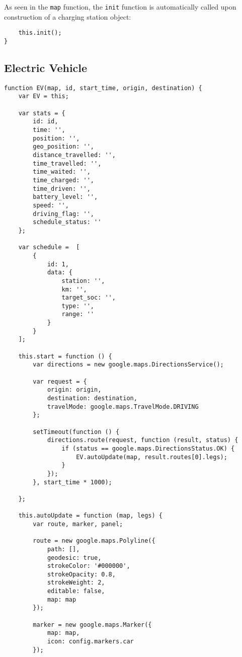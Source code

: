 As seen in the \texttt{map} function, the \texttt{init} function is automatically called upon construction of a charging station object:

\begin{verbatim}
    this.init();
}
\end{verbatim}


\newpage
\subsection{Electric Vehicle}

\begin{verbatim}
function EV(map, id, start_time, origin, destination) {
    var EV = this;

    var stats = {
        id: id,
        time: '',
        position: '',
        geo_position: '',
        distance_travelled: '',
        time_travelled: '',
        time_waited: '',
        time_charged: '',
        time_driven: '',
        battery_level: '',
        speed: '',
        driving_flag: '',
        schedule_status: ''
    };

    var schedule =  [
        {
            id: 1,
            data: {
                station: '',
                km: '',
                target_soc: '',
                type: '',
                range: ''
            }
        }
    ];

    this.start = function () {
        var directions = new google.maps.DirectionsService();

        var request = {
            origin: origin,
            destination: destination,
            travelMode: google.maps.TravelMode.DRIVING
        };

        setTimeout(function () {
            directions.route(request, function (result, status) {
                if (status == google.maps.DirectionsStatus.OK) {
                    EV.autoUpdate(map, result.routes[0].legs);
                }
            });
        }, start_time * 1000);

    };

    this.autoUpdate = function (map, legs) {
        var route, marker, panel;

        route = new google.maps.Polyline({
            path: [],
            geodesic: true,
            strokeColor: '#000000',
            strokeOpacity: 0.8,
            strokeWeight: 2,
            editable: false,
            map: map
        });

        marker = new google.maps.Marker({
            map: map,
            icon: config.markers.car
        });


\end{verbatim}

